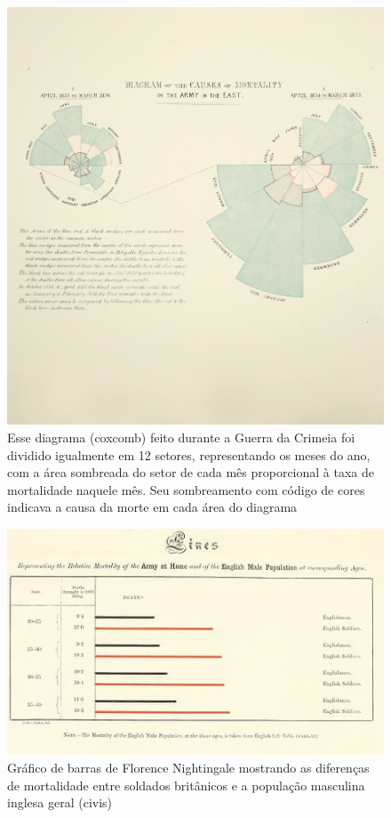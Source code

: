 \documentclass[
]{book}
\begin{document}
\begin{figure}

{\centering \includegraphics[width=0.75\linewidth]{images1/florence-rose-diagram} 

}

\caption{Esse diagrama (coxcomb) feito durante a Guerra da Crimeia foi dividido igualmente em 12 setores, representando os meses do ano, com a área sombreada do setor  de cada mês proporcional à taxa de mortalidade naquele mês. Seu sombreamento com código de cores indicava a causa da morte em cada área do diagrama}\label{fig:figA12}
\end{figure}

\hfill\break

\begin{figure}

{\centering \includegraphics[width=0.75\linewidth]{images1/florence-barr} 

}

\caption{Gráfico de barras de Florence Nightingale mostrando as diferenças de mortalidade entre soldados britânicos e a população masculina inglesa geral (civis)}\label{fig:figA13}
\end{figure}
\end{document}
